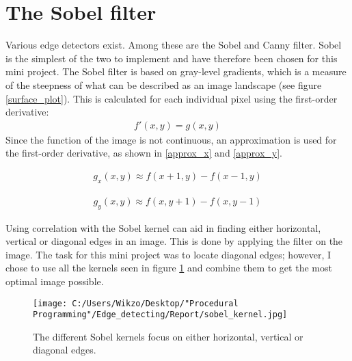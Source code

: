 \section{The Sobel filter}
Various edge detectors exist. Among these are the Sobel and Canny filter. Sobel is the simplest of the two to implement and have therefore been chosen for this mini project. The Sobel filter is based on gray-level gradients, which is a measure of the steepness of what can be described as an image landscape (see figure \ref{surface_plot}). This is calculated for each individual pixel using the first-order derivative: \begin{align}f'(x,y) = g(x,y)\nonumber \end{align}
Since the function of the image is not continuous, an approximation is used for the first-order derivative, as shown in \ref{approx_x} and \ref{approx_y}.

\begin{align}
g_x(x,y) \approx f(x+1,y)-f(x-1,y)
\label{approx_x}
\end{align}

\begin{align}
g_y(x,y) \approx f(x, y+1)-f(x,y-1)
\label{approx_y}
\end{align}

Using correlation with the Sobel kernel can aid in finding either horizontal, vertical or diagonal edges in an image. This is done by applying the filter on the image. The task for this mini project was to locate diagonal edges; however, I chose to use all the kernels seen in figure \ref{sobel_kernel} and combine them to get the most optimal image possible.

\begin{figure} [htbp]
\texttt{[image: C:/Users/Wikzo/Desktop/"Procedural Programming"/Edge\_detecting/Report/sobel\_kernel.jpg]}
\centering
\label{sobel_kernel}
\caption{The different Sobel kernels focus on either horizontal, vertical or diagonal edges.}
\end{figure}